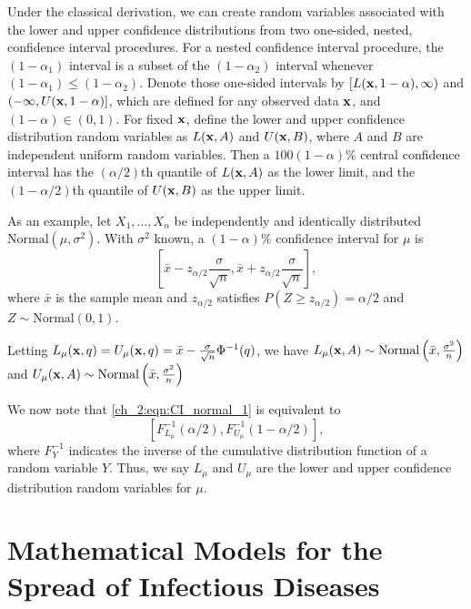 Under the classical derivation, we can create random variables associated with the lower and upper confidence distributions from two one-sided, nested, confidence interval procedures.
For a nested confidence interval procedure, the $(1-\alpha_1)$ interval is a subset of the $(1-\alpha_2)$ interval whenever $(1-\alpha_1) \leq (1-\alpha_2)$.
Denote those one-sided intervals by $[L({\bf x},1-\alpha), \infty)$ and $(-\infty, U({\bf x},1-\alpha)]$, which are defined for any observed data ${\bf x}$, and $(1-\alpha) \in (0,1)$.
For fixed ${\bf x}$, define the lower and upper confidence distribution random variables as $L({\bf x}, A)$ and $U({\bf x},B)$, where $A$ and $B$ are independent uniform random variables.
Then a $100(1-\alpha)\%$ central confidence interval has the $(\alpha/2)$th quantile of $L({\bf x}, A)$ as the lower limit, and the $(1-\alpha/2)$th quantile of $U({\bf x},B)$ as the upper limit.

As an example, let \( X_1, \ldots, X_n \) be independently and identically distributed \( \textrm{Normal}(\mu, \sigma^2) \).
With \( \sigma^2 \) known, a \( (1 - \alpha) \)\% confidence interval for \( \mu \) is
\begin{equation}
\left[ \bar{x} - z_{\alpha/2} \frac{\sigma}{\sqrt{n}}, \bar{x} + z_{\alpha/2} \frac{\sigma}{\sqrt{n}} \right],
\label{ch_2:eqn:CI_normal_1}
\end{equation}
where \( \bar{x} \) is the sample mean and \( z_{\alpha / 2} \) satisfies \( P(Z \geq z_{\alpha / 2}) = \alpha / 2 \) and \( Z \sim \textrm{Normal}(0,1) \).

Letting \( L_\mu (\mathbf{x}, q) = U_\mu (\mathbf{x}, q) = \bar{x} - \frac{\sigma}{\sqrt{n}} \Phi^{-1}(q) \), we have \( L_\mu(\mathbf{x}, A) \sim \textrm{Normal} \left( \bar{x}, \frac{\sigma^2}{n} \right) \) and \( U_\mu(\mathbf{x}, A) \sim \textrm{Normal} \left( \bar{x}, \frac{\sigma^2}{n} \right) \)

We now note that \eqref{ch_2:eqn:CI_normal_1} is equivalent to
\begin{equation}
    \left[ F_{L_{\mu}}^{-1}(\alpha / 2), F_{U_{\mu}}^{-1}(1- \alpha / 2) \right],
\end{equation}
where \( F_Y^{-1} \) indicates the inverse of the cumulative distribution function of a random variable \( Y \).
Thus, we say \( L_\mu \) and \( U_\mu \) are the lower and upper confidence distribution random variables for \( \mu \).

\section{Mathematical Models for the Spread of Infectious Diseases}
\label{sec:math_models}

